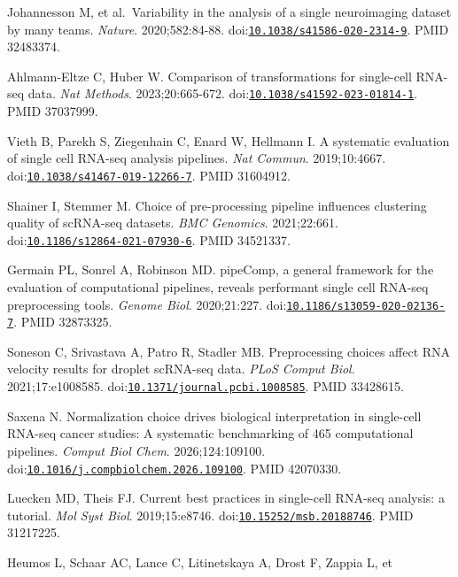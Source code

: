 \documentclass[11pt]{article}
\begin{document}
\begin{enumerate}[label={[\arabic*]},leftmargin=2.6em,labelsep=0.5em,itemsep=1.5pt]
  Johannesson M, et al.~Variability in the analysis of a single
  neuroimaging dataset by many teams. \emph{Nature}. 2020;582:84-88.
  doi:\href{https://doi.org/10.1038/s41586-020-2314-9}{\nolinkurl{10.1038/s41586-020-2314-9}}.
  PMID 32483374.
\item
  Ahlmann-Eltze C, Huber W. Comparison of transformations for
  single-cell RNA-seq data. \emph{Nat Methods}. 2023;20:665-672.
  doi:\href{https://doi.org/10.1038/s41592-023-01814-1}{\nolinkurl{10.1038/s41592-023-01814-1}}.
  PMID 37037999.
\item
  Vieth B, Parekh S, Ziegenhain C, Enard W, Hellmann I. A systematic
  evaluation of single cell RNA-seq analysis pipelines. \emph{Nat
  Commun}. 2019;10:4667.
  doi:\href{https://doi.org/10.1038/s41467-019-12266-7}{\nolinkurl{10.1038/s41467-019-12266-7}}.
  PMID 31604912.
\item
  Shainer I, Stemmer M. Choice of pre-processing pipeline influences
  clustering quality of scRNA-seq datasets. \emph{BMC Genomics}.
  2021;22:661.
  doi:\href{https://doi.org/10.1186/s12864-021-07930-6}{\nolinkurl{10.1186/s12864-021-07930-6}}.
  PMID 34521337.
\item
  Germain PL, Sonrel A, Robinson MD. pipeComp, a general framework for
  the evaluation of computational pipelines, reveals performant single
  cell RNA-seq preprocessing tools. \emph{Genome Biol}. 2020;21:227.
  doi:\href{https://doi.org/10.1186/s13059-020-02136-7}{\nolinkurl{10.1186/s13059-020-02136-7}}.
  PMID 32873325.
\item
  Soneson C, Srivastava A, Patro R, Stadler MB. Preprocessing choices
  affect RNA velocity results for droplet scRNA-seq data. \emph{PLoS
  Comput Biol}. 2021;17:e1008585.
  doi:\href{https://doi.org/10.1371/journal.pcbi.1008585}{\nolinkurl{10.1371/journal.pcbi.1008585}}.
  PMID 33428615.
\item
  Saxena N. Normalization choice drives biological interpretation in
  single-cell RNA-seq cancer studies: A systematic benchmarking of 465
  computational pipelines. \emph{Comput Biol Chem}. 2026;124:109100.
  doi:\href{https://doi.org/10.1016/j.compbiolchem.2026.109100}{\nolinkurl{10.1016/j.compbiolchem.2026.109100}}.
  PMID 42070330.
\item
  Luecken MD, Theis FJ. Current best practices in single-cell RNA-seq
  analysis: a tutorial. \emph{Mol Syst Biol}. 2019;15:e8746.
  doi:\href{https://doi.org/10.15252/msb.20188746}{\nolinkurl{10.15252/msb.20188746}}.
  PMID 31217225.
\item
  Heumos L, Schaar AC, Lance C, Litinetskaya A, Drost F, Zappia L, et

\end{enumerate}
\end{document}

